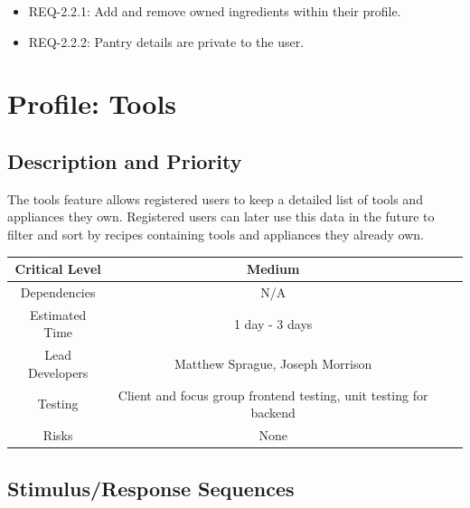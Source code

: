 \documentclass{scrreprt}
\begin{document}
\begin{itemize}
    \item REQ-2.2.1: Add and remove owned ingredients within their profile.
    \item REQ-2.2.2: Pantry details are private to the user.
\end{itemize}

\section{Profile: Tools}

\subsection{Description and Priority}

The tools feature allows registered users to keep a detailed list of tools and appliances they own. Registered users can later use this data in the future to filter and sort by recipes containing tools and appliances they already own.

\begin{center}
    \begin{tabular}{| c | c | c | c |}
        \hline
        Critical Level  & Medium                                                            \\
        \hline
        Dependencies    & N/A                                                               \\
        \hline
        Estimated Time  & 1 day - 3 days                                                    \\
        \hline
        Lead Developers & Matthew Sprague, Joseph Morrison                                  \\
        \hline
        Testing         & Client and focus group frontend testing, unit testing for backend \\
        \hline
        Risks           & None                                                              \\
        \hline
    \end{tabular}
\end{center}

\subsection{Stimulus/Response Sequences}
\end{document}
